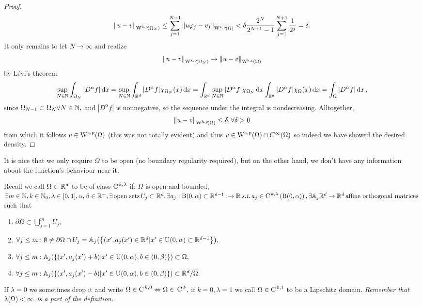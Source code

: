 \documentclass{article}
\begin{document}
\begin{proof}
	\begin{equation*}
		\norm{u-v}_{\WkpSet{\Omega_N}} \leq \sum_{j=1}^{N+1}\norm{u \varphi_j - v_j}_{\WkpSet{\Omega}} <\delta \frac{2^N}{2^{N+1}-1}\sum_{j=1}^{N+1} \frac{1}{2^j} = \delta.
	\end{equation*}
	It only remains to let $N \to \infty$ and realize
	\[
		\norm{u-v}_{\WkpSet{\Omega_N}} \to \norm{u-v}_{\WkpSet{\Omega}}
	\]
	by Lévi's theorem:
	\[
	\sup_{N\in {\mathbb N}}\int_{\Omega_N}|D^\alpha f| \dd{x} = \sup_{N \in {\mathbb N}}\int_{{\mathbb R}^d}|D^{\alpha}f|\chi_{\Omega_N}(x)\dd{x} = \int_{{\mathbb R}^d}\sup_{N \in {\mathbb N}}|D^{\alpha}f| \chi_{\Omega_N}\dd{x} \int_{{\mathbb R}^d}|D^\alpha f|\chi_{\Omega}(x)	\dd{x} = \int_{\Omega}|D^{\alpha}f|\dd{x},
	\]
	since $\Omega_{N-1} \subset \Omega_{N} \forall N \in {\mathbb N},$ and $|D^{\alpha}f|$ is nonnegative, so the sequence under the integral is nondecreasing. Alltogether,
	\[
		\norm{u-v}_{\WkpSet{\Omega}}\leq \delta, \forall \delta>0
	\]
	from which it follows $v \in \WkpSet{\Omega}$ (this was not totally evident) and thus $v \in \WkpSet{\Omega} \cap C^{\infty}\qty(\Omega)$ so indeed we have showed the desired density.
\end{proof}

\begin{remark}
	It is nice that we only require $\Omega$ to be open (no boundary regularity required), but on the other hand, we don't have any information about the function's behaviour near it.
\end{remark}

\begin{remark}
	Recall we call $\Omega \subset {\mathbb R}^{d}$ to be of class $\text{C}^{\!\,\, k,\lambda}$ if: $\Omega$ is open and bounded, $\exists m \in {\mathbb N}, k \in {\mathbb N}_0, \lambda \in [0,1], \alpha, \beta \in {\mathbb R}^+, \exists \, \text{open sets} \, U_j \subset {\mathbb R}^d, \exists a_j: \text{B}(0,\alpha) \subset {\mathbb R}^{d-1}: \to {\mathbb R} \, \text{\textit{s.t.}} \, a_j \in \text{C}^{\!\, \,k,\lambda}\!\,\left(\text{B}(0,\alpha) \right), \exists \mathbb{A}_j {\mathbb R}^{d} \to {\mathbb R}^{d} \, \text{affine orthogonal matrices} \,$ such that 
	\begin{enumerate}
		\item $\partial \Omega \subset \bigcup_{j=1}^m U_j,$
		\item $\forall j \leq m: \emptyset \neq \partial \Omega \cap U_j = \mathbb{A}_j\qty(\qty{(x',a_j\qty(x') \in \ensuremath{{\mathbb R}}^d | x' \in \text{U}(0,\alpha)\subset \ensuremath{{\mathbb R}}^{d-1}}),$
		\item $\forall j \leq m: \mathbb{A}_j\qty(\qty{(x', a_j(x') + b) | x' \in \text{U}(0,\alpha), b \in (0,\beta)}) \subset \Omega,$
		\item $\forall j \leq m: \mathbb{A}_j\qty(\qty{(x', a_j(x') - b) | x' \in \text{U}(0,\alpha), b \in (0,\beta)}) \subset {\mathbb R}^d/ \overline{\Omega}.$
\end{enumerate}
	If $\lambda = 0$ we sometimes drop it and write $\Omega \in \text{C}^{\!\,\, k,0} \Leftrightarrow \Omega \in \, \text{C} \,^k,$ if $k = 0, \lambda =1$ we call $\Omega \in \text{C}^{\!\,\, 0,1}$ to be a Lipschitz domain.
\textit{Remember that $\lambda\qty(\Omega)<\infty$ is a part of the definition.}

\end{remark}
\end{document}
